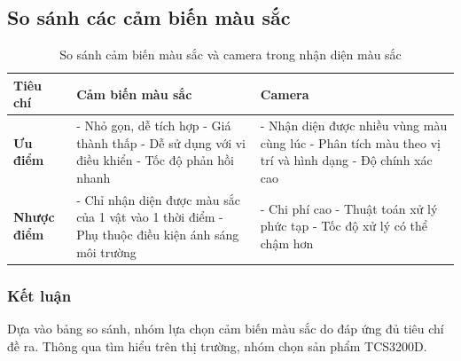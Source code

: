         \subsection{So sánh các cảm biến màu sắc}
            \begin{table}[H]
                \centering
                \caption{So sánh cảm biến màu sắc và camera trong nhận diện màu sắc}
                \label{tab:compare_color_sensors}
                \begin{tabular}{|>{\raggedright\arraybackslash}p{4cm}|>{\raggedright\arraybackslash}p{5.5cm}|>{\raggedright\arraybackslash}p{5.5cm}|}
                \hline
                \textbf{Tiêu chí} & \textbf{Cảm biến màu sắc} & \textbf{Camera} \\
                \hline
                \textbf{Ưu điểm} 
                & 
                - Nhỏ gọn, dễ tích hợp \newline
                - Giá thành thấp \newline
                - Dễ sử dụng với vi điều khiển \newline
                - Tốc độ phản hồi nhanh
                &
                - Nhận diện được nhiều vùng màu cùng lúc \newline
                - Phân tích màu theo vị trí và hình dạng \newline
                - Độ chính xác cao \newline
                \\
                \hline
                \textbf{Nhược điểm} 
                & 
                - Chỉ nhận diện được màu sắc của 1 vật vào 1 thời điểm \newline
                - Phụ thuộc điều kiện ánh sáng môi trường \newline
                &
                - Chi phí cao \newline
                - Thuật toán xử lý phức tạp \newline
                - Tốc độ xử lý có thể chậm hơn
                \\
                \hline
                \end{tabular}
            \end{table}
        \subsubsection{Kết luận}
            \hspace*{0.6cm}Dựa vào bảng so sánh, nhóm lựa chọn cảm biến màu sắc do đáp ứng đủ tiêu chí đề ra. Thông qua tìm hiểu trên thị trường, nhóm chọn sản phẩm TCS3200D. 

